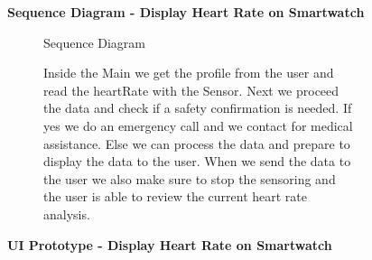 \documentclass{article}
\begin{document}
	\begin{figure}[htbp]
		\textbf{Sequence Diagram - Display Heart Rate on Smartwatch}
		\centering
		\begin{subfigure}{\textwidth}
			\resizebox{\textwidth}{!}{}
			\caption{Sequence Diagram}
		\end{subfigure}
		\begin{subfigure}{\textwidth}
			Inside the Main we get the profile from the user and read the heartRate with the Sensor. Next we proceed the data and check 
			if a safety confirmation is needed. If yes we do an emergency call and we contact for medical assistance. Else we can process 
			the data and prepare to display the data to the user. When we send the data to the user we also make sure to stop the sensoring and 
			the user is able to review the current heart rate analysis. 
		\end{subfigure}
	\end{figure}
	\clearpage
	\begin{figure}[htbp]
		\textbf{UI Prototype - Display Heart Rate on Smartwatch}
		\centering
		\begin{subfigure}{\textwidth}
			\resizebox{\textwidth}{!}{}
		\end{subfigure}
		\begin{subfigure}{\textwidth}
		
		\end{subfigure}
	\end{figure}
	\clearpage
\end{document}
